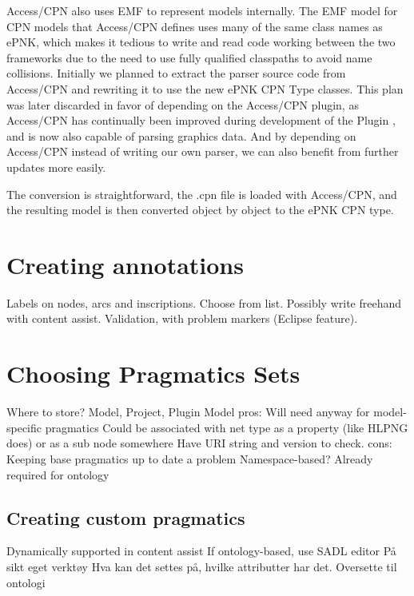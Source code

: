 Access/CPN also uses EMF to represent models internally. The EMF model for CPN
models that Access/CPN defines uses many of the same class names as ePNK, which
makes it tedious to write and read code working between the two frameworks due
to the need to use fully qualified classpaths to avoid name collisions.
Initially we planned to extract the parser source code from Access/CPN and
rewriting it to use the new ePNK CPN Type classes. This plan was later discarded in
favor of depending on the Access/CPN plugin, as Access/CPN has continually been
improved during development of the Plugin , and is now also
capable of parsing graphics data. And by depending on Access/CPN instead of writing
our own parser, we can also benefit from further updates more easily.

The conversion is straightforward, the .cpn file is loaded with Access/CPN,
and the resulting model is then converted object by object to the ePNK CPN type.

\section{Creating annotations}
Labels on nodes, arcs and inscriptions. 
Choose from list. Possibly write freehand with content assist. Validation, with
problem markers (Eclipse feature).

\section{Choosing Pragmatics Sets}
Where to store? Model, Project, Plugin
Model pros:
	Will need anyway for model-specific pragmatics
	Could be associated with net type as a property (like HLPNG does) or as a sub
	node somewhere
	Have URI string and version to check.
cons:
	Keeping base pragmatics up to date a problem
Namespace-based? Already required for ontology


	\subsection{Creating custom pragmatics}
	Dynamically supported in content assist 
	If ontology-based, use SADL editor
	På sikt eget verktøy
		Hva kan det settes på, hvilke attributter har det.
		Oversette til ontologi

